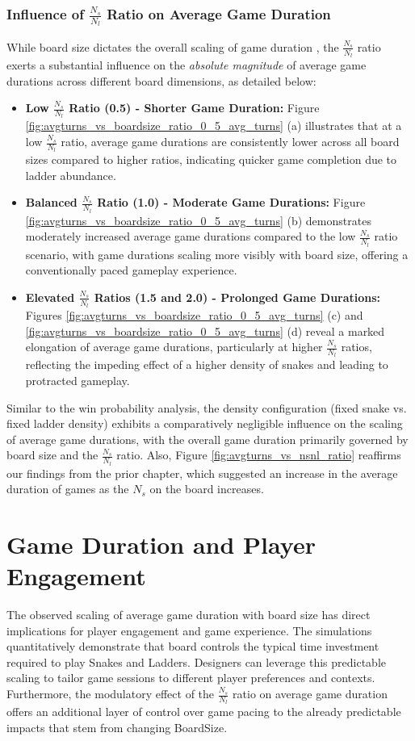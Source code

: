 \subsubsection{Influence of $\frac{N_s}{N_l}$ Ratio on Average Game Duration} While board size dictates the overall scaling of game duration , the $\frac{N_s}{N_l}$ ratio exerts a substantial influence on the \textit{absolute magnitude} of average game durations across different board dimensions, as detailed below:

\begin{itemize}
	\item \textbf{Low $\frac{N_s}{N_l}$ Ratio (0.5) - Shorter Game Duration:} Figure \ref{fig:avgturns_vs_boardsize_ratio_0_5_avg_turns} (a) illustrates that at a low $\frac{N_s}{N_l}$ ratio, average game durations are consistently lower across all board sizes compared to higher ratios, indicating quicker game completion due to ladder abundance. 
	
	\item \textbf{Balanced $\frac{N_s}{N_l}$ Ratio (1.0) - Moderate Game Durations:} Figure \ref{fig:avgturns_vs_boardsize_ratio_0_5_avg_turns} (b) demonstrates moderately increased average game durations compared to the low $\frac{N_s}{N_l}$ ratio scenario, with game durations scaling more visibly with board size, offering a conventionally paced gameplay experience.
	
	\item \textbf{Elevated $\frac{N_s}{N_l}$ Ratios (1.5 and 2.0) - Prolonged Game Durations:} Figures \ref{fig:avgturns_vs_boardsize_ratio_0_5_avg_turns} (c) and \ref{fig:avgturns_vs_boardsize_ratio_0_5_avg_turns} (d) reveal a marked elongation of average game durations, particularly at higher $\frac{N_s}{N_l}$ ratios, reflecting the impeding effect of a higher density of snakes and leading to protracted gameplay.
\end{itemize}

Similar to the win probability analysis, the density configuration (fixed snake vs. fixed ladder density) exhibits a comparatively negligible influence on the scaling of average game durations, with the overall game duration primarily governed by board size and the $\frac{N_s}{N_l}$ ratio.
Also, Figure \ref{fig:avgturns_vs_nsnl_ratio} reaffirms our findings from the prior chapter, which suggested an increase in the average duration of games as the $N_s$ on the board increases.

\section{Game Duration and Player Engagement}  
The observed scaling of average game duration with board size has direct implications for player engagement and game experience.  The simulations quantitatively demonstrate that board controls the typical time investment required to play Snakes and Ladders. Designers can leverage this predictable scaling to tailor game sessions to different player preferences and contexts. Furthermore, the modulatory effect of the $\frac{N_s}{N_l}$ ratio on average game duration offers an additional layer of control over game pacing to the already predictable impacts that stem from changing BoardSize.

